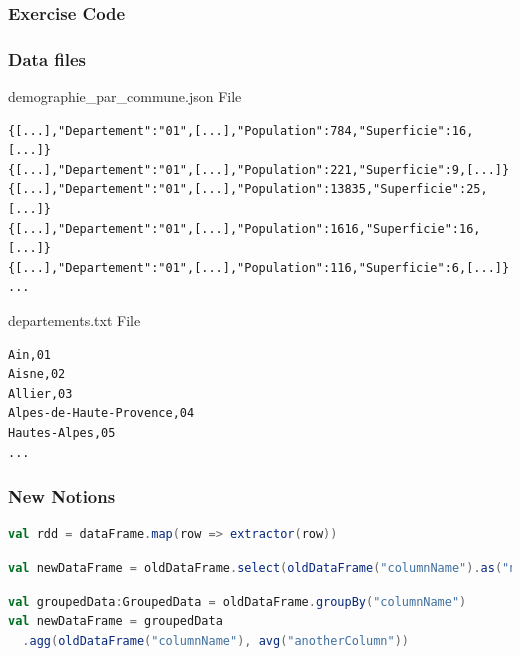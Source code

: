 \documentclass[slidetop,9pt,utf8]{beamer}
\begin{document}
\begin{frame}
  \frametitle{Exercise Code}

  

\end{frame}

\begin{frame}[fragile]
  \frametitle{Data files}

  \begin{block}{demographie\_par\_commune.json File}
    \begin{verbatim}
{[...],"Departement":"01",[...],"Population":784,"Superficie":16,[...]}
{[...],"Departement":"01",[...],"Population":221,"Superficie":9,[...]}
{[...],"Departement":"01",[...],"Population":13835,"Superficie":25,[...]}
{[...],"Departement":"01",[...],"Population":1616,"Superficie":16,[...]}
{[...],"Departement":"01",[...],"Population":116,"Superficie":6,[...]}
...
    \end{verbatim}
  \end{block}

  \begin{block}{departements.txt File}
    \begin{verbatim}
Ain,01
Aisne,02
Allier,03
Alpes-de-Haute-Provence,04
Hautes-Alpes,05
...
    \end{verbatim}
  \end{block}

\end{frame}

\begin{frame}[fragile]
  \frametitle{New Notions}

  \begin{lstlisting}[label=DataFrameToRDD, caption=Transform a DataFrame to RDD, language=scala, style=code]
val rdd = dataFrame.map(row => extractor(row))
  \end{lstlisting}

  \begin{lstlisting}[label=changeNameSelectedColumn, caption=Change name of a column, language=scala, style=code]
val newDataFrame = oldDataFrame.select(oldDataFrame("columnName").as("newColumnName"))
  \end{lstlisting}

  \begin{lstlisting}[label=GroupByColumn, caption=Group By Column, language=scala, style=code]
val groupedData:GroupedData = oldDataFrame.groupBy("columnName")
val newDataFrame = groupedData
  .agg(oldDataFrame("columnName"), avg("anotherColumn"))
  \end{lstlisting}

\end{frame}
\end{document}
